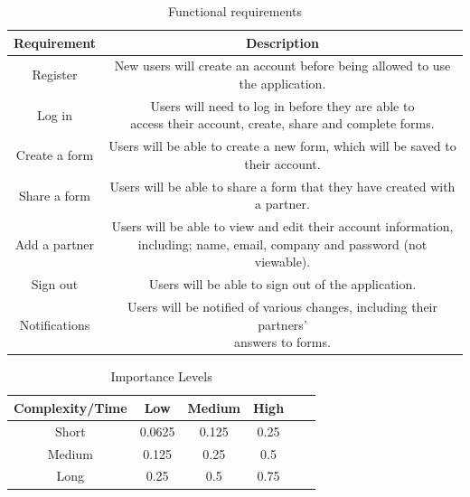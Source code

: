 \begin{table}[h]
    \centering
    \begin{tabular}{|c|c|}
        \hline
        Requirement & Description\\
        \hline
        \hline
        Register & \makecell{New users will create an account before being allowed to use\\the application.}\\
        \hline
        Log in & \makecell{Users will need to log in before they are able to\\access their account, create, share and complete forms.}\\
        \hline
        Create a form & \makecell{Users will be able to create a new form, which will be saved to\\their account.}\\
        \hline
        Share a form & \makecell{Users will be able to share a form that they have created with\\a partner.}\\
        \hline
        Add a partner & \makecell{Users will be able to view and edit their account information,\\including; name, email, company and password (not viewable).}\\
        \hline
        Sign out & Users will be able to sign out of the application.\\
        \hline
        Notifications & \makecell{Users will be notified of various changes, including their partners'\\answers to forms.}\\
        \hline
    \end{tabular}
    \caption{Functional requirements}
\end{table}

\begin{table}[h]
    \centering
    \begin{tabular}{|c||c|c|c|c|c|}
        \hline
        Complexity/Time & Low & Medium & High\\
        \hline
        \hline
        Short & 0.0625 & 0.125 & 0.25\\
        \hline
        Medium & 0.125 & 0.25 & 0.5\\
        \hline
        Long & 0.25 & 0.5 & 0.75\\
        \hline
    \end{tabular}
    \caption{Importance Levels}
\end{table}

